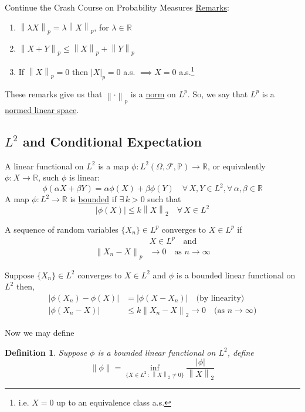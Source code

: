 \documentclass[12pt]{article}
\newtheorem{definition}{Definition}
\newcommand\norm[1]{\left\lVert#1\right\rVert} %
\begin{document}
\begin{section}{Continue the Crash Course on Probability Measures}
\noindent \underline{Remarks}:
\begin{enumerate}
	\item $\norm{\lambda X}_p = \lambda\norm{X}_p$, for $\lambda \in \mathbb R$
	\item $\norm{X + Y}_p \leq \norm{X}_p + \norm{Y}_p$
	\item If $\norm{X}_p = 0$ then $|X|_p = 0$ a.s. $\implies X = 0$ a.s.\footnote{i.e. $X = 0$ up to an equivalence class a.s.}
\end{enumerate}
These remarks give us that $\norm{\cdot}_p$ is a \underline{norm} on $L^p$. So, we say that $L^p$ is a \underline{normed linear space}.

\subsection{$L^2$ and Conditional Expectation}

A linear functional on $L^2$ is a map $\phi : L^2(\Omega, \mathcal F, \mathbb P) \rightarrow \mathbb R$, or equivalently $\phi : X \rightarrow \mathbb R$, such $\phi$ is linear:
\begin{equation*}
	\phi(\alpha X + \beta Y) = \alpha\phi(X) + \beta\phi(Y) \quad \forall\,X,Y \in L^2,\forall\,\alpha,\beta\in\mathbb R
\end{equation*}
A map $\phi: L^2 \rightarrow \mathbb R$ is \underline{bounded} if $\exists\,k>0$ such that
\begin{equation*}
	|\phi(X)| \leq k\norm{X}_2 \quad \forall\,X\in L^2
\end{equation*}

\noindent A sequence of random variables $\{X_n\} \in L^p$ converges to $X \in L^p$ if
\begin{align*}
	&X \in L^p \quad \text{and} \\
	\norm{X_n - X}_p &\longrightarrow 0 \quad \text{as $n \longrightarrow \infty$}
\end{align*}

\noindent Suppose $\{X_n\} \in L^2$ converges to $X \in L^2$ and $\phi$ is a bounded linear functional on $L^2$ then,
\begin{align*}
	|\phi(X_n) - \phi(X)| &= |\phi(X - X_n)| \quad \text{(by linearity)} \\
	|\phi(X_n - X)| &\leq k\norm{X_n - X}_2 \longrightarrow 0 \quad \text{(as $n \longrightarrow \infty$)}
\end{align*}

\noindent Now we may define
\begin{definition} Suppose $\phi$ is a bounded linear functional on $L^2$, define
\begin{equation*}
	\norm{\phi} = \inf_{\{X \in L^2\,:\,\norm{X}_2 \neq 0\}} \frac{|\phi|}{\norm{X}_2}
\end{equation*}
\end{definition}


\end{section}
\end{document}

